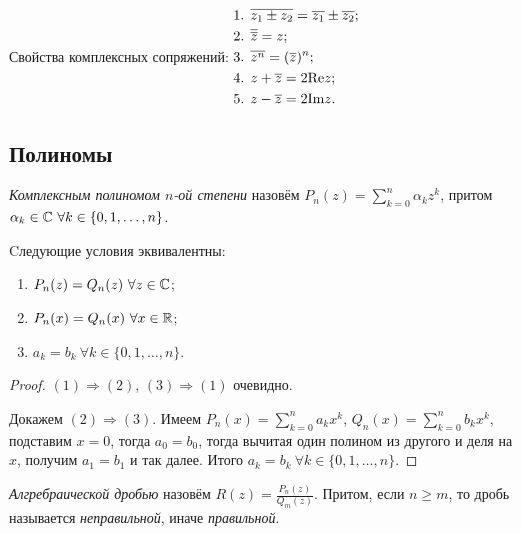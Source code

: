 Свойства комплексных сопряжений: \quad
$\begin{gathered}
    \text{1. } \overline{z_{1} \pm z_{2}} = \overline{z_{1}} \pm \overline{z_{2}}; \hfill \\
    \text{2. } \overline{\overline{z}} = z; \hfill \\
    \text{3. } \overline{z^{n}} = (\overline{z})^{n}; \hfill \\
    \text{4. } z + \overline{z} = 2 \text{Re}z; \hfill \\
    \text{5. } z - \overline{z} = 2 \text{Im}z. \hfill
\end{gathered}$

\subsection{Полиномы}
\begin{definition}
    \textit{Комплексным полиномом $n$-ой степени} назовём $\displaystyle P_{n} (z) = \sum_{k = 0}^{n} \alpha_{k} z^{k}$, притом $\alpha_{k} \in \mathbb{C} \  \forall k \in \{ 0, 1, \ldots, n \}$.
\end{definition}
\begin{proposition}
    \hypertarget{prop6.1}{Cледующие условия эквивалентны:}
    \begin{enumerate}
        \item $P_{n} (z) = Q_{n} (z) \  \forall z \in \mathbb{C}$;
        \item $P_{n} (x) = Q_{n} (x) \  \forall x \in \mathbb{R}$;
        \item $a_{k} = b_{k} \  \forall k \in \{0, 1, \ldots, n \}$.
    \end{enumerate}
\end{proposition}
\begin{proof}
    $(1) \Rightarrow (2)$, $(3) \Rightarrow (1)$ очевидно.

    Докажем $(2) \Rightarrow (3)$. Имеем $\displaystyle P_{n} (x) = \sum_{k = 0}^{n} a_{k} x^{k}$, $\displaystyle Q_{n} (x) = \sum_{k = 0}^{n} b_{k} x^{k}$, подставим $x = 0$, тогда $a_{0} = b_{0}$, тогда вычитая один полином из другого и деля на $x$, получим $a_{1} = b_{1}$ и так далее. Итого $a_{k} = b_{k} \  \forall k \in \{ 0, 1, \ldots, n \}$.
\end{proof}
\begin{definition}
    \textit{Алгребраической дробью} назовём $R (z) = \frac{P_{n} (z)}{Q_{m} (z)}$. Притом, если $n \geq m$, то дробь называется \textit{неправильной}, иначе \textit{правильной}.
\end{definition}
